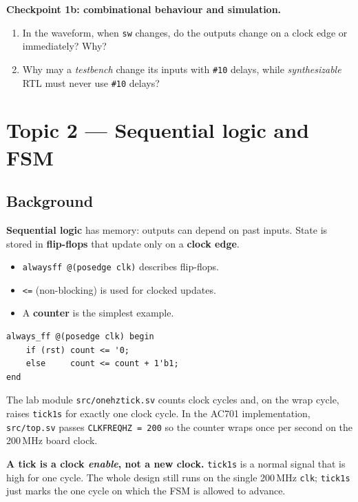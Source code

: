 \documentclass[11pt]{article}
\renewcommand{\_}{\textunderscore\allowbreak}
\begin{document}
\begin{questionbox}
\textbf{Checkpoint 1b: combinational behaviour and simulation.}
\begin{enumerate}[noitemsep]
  \item In the waveform, when \texttt{sw} changes, do the outputs change on a clock edge or immediately? Why?
  \item Why may a \emph{testbench} change its inputs with \texttt{\#10} delays, while \emph{synthesizable} RTL must never use \texttt{\#10} delays?
\end{enumerate}
\end{questionbox}

\newpage
\section{Topic 2 --- Sequential logic and FSM}

\subsection{Background}
\textbf{Sequential logic} has memory: outputs can depend on past inputs. State is stored in
\textbf{flip-flops} that update only on a \textbf{clock edge}.
\begin{itemize}[noitemsep]
  \item \texttt{always\_ff @(posedge clk)} describes flip-flops.
  \item \texttt{<=} (non-blocking) is used for clocked updates.
  \item A \textbf{counter} is the simplest example.
\end{itemize}
\begin{lstlisting}[style=sv]
always_ff @(posedge clk) begin
    if (rst) count <= '0;
    else     count <= count + 1'b1;
end
\end{lstlisting}
The lab module \texttt{src/one\_hz\_tick.sv} counts clock cycles and, on the wrap cycle, raises
\texttt{tick\_1s} for exactly one clock cycle. In the AC701 implementation, \texttt{src/top.sv}
passes \texttt{CLK\_FREQ\_HZ = 200\_000\_000} so the counter wraps once per second on the 200\,MHz
board clock.

\begin{notebox}
\textbf{A tick is a clock \emph{enable}, not a new clock.} \texttt{tick\_1s} is a normal signal that
is high for one cycle. The whole design still runs on the single 200\,MHz \texttt{clk}; \texttt{tick\_1s}
just marks the one cycle on which the FSM is allowed to advance.
\end{notebox}
\end{document}
